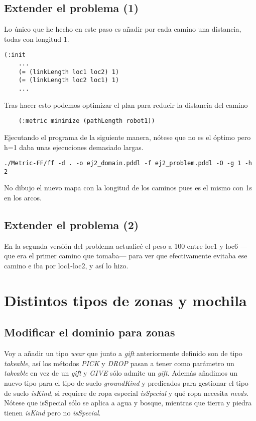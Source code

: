 \documentclass{article}
\begin{document}
\subsection{Extender el problema (1)}

	Lo único que he hecho en este paso es añadir por cada camino una distancia, todas con longitud 1.
\begin{lstlisting}
(:init
	...
	(= (linkLength loc1 loc2) 1)
	(= (linkLength loc2 loc1) 1)
	...
\end{lstlisting}

	Tras hacer esto podemos optimizar el plan para reducir la distancia del camino
\begin{lstlisting}
	(:metric minimize (pathLength robot1))
\end{lstlisting}

	Ejecutando el programa de la siguiente manera, nótese que no es el óptimo pero h=1 daba unas ejecuciones demasiado largas.
	
\begin{lstlisting}	
./Metric-FF/ff -d . -o ej2_domain.pddl -f ej2_problem.pddl -O -g 1 -h 2
\end{lstlisting}

	No dibujo el nuevo mapa con la longitud de los caminos pues es el mismo con 1s en los arcos.

\subsection{Extender el problema (2)}
	
	En la segunda versión del problema actualicé el peso a 100 entre loc1 y loc6 ---que era el primer camino que tomaba--- para ver que efectivamente evitaba ese camino e iba por loc1-loc2, y así lo hizo.

\section{Distintos tipos de zonas y mochila}

\subsection{Modificar el dominio para zonas}

Voy a añadir un tipo \emph{wear} que junto a \emph{gift} anteriormente definido son de tipo \emph{takeable}, así los métodos \emph{PICK} y \emph{DROP} pasan a tener como parámetro un \emph{takeable} en vez de un \emph{gift} y \emph{GIVE} sólo admite un \emph{gift}. Además añadimos un nuevo tipo para el tipo de suelo \emph{groundKind} y predicados para gestionar el tipo de suelo \emph{isKind}, si requiere de ropa especial \emph{isSpecial} y qué ropa necesita \emph{needs}. Nótese que isSpecial sólo se aplica a agua y bosque, mientras que tierra y piedra tienen \emph{isKind} pero no \emph{isSpecial}.
\end{document}
